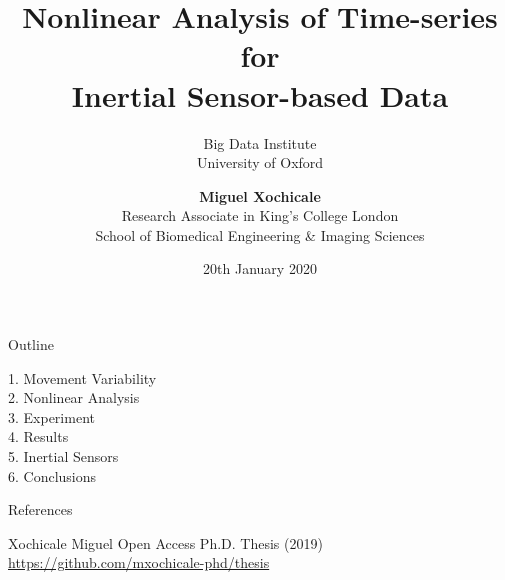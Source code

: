 \documentclass[compress]{beamer}
\title{
Nonlinear Analysis of Time-series for \\ 
	Inertial Sensor-based Data 
	}
\subtitle{Big Data Institute\\
	University of Oxford}
\date{20th January 2020}
\author{{\bf Miguel Xochicale} \\
	Research Associate in King's College London\\
        School of Biomedical Engineering & Imaging Sciences}
\begin{document}

\maketitle




\subsection{}
{
\begin{frame}{Outline}


1. Movement Variability \\
2. Nonlinear Analysis \\
3. Experiment \\
4. Results \\
5. Inertial Sensors \\
6. Conclusions 

\end{frame}
}
















\begin{frame}{References}
    \begin{thebibliography}{10}

\beamertemplatearticlebibitems

	Xochicale Miguel
	\newblock {} 
      	\newblock Open Access Ph.D. Thesis (2019) 
      	\newblock \url{https://github.com/mxochicale-phd/thesis}


    \end{thebibliography}
\end{frame}



\end{document}
